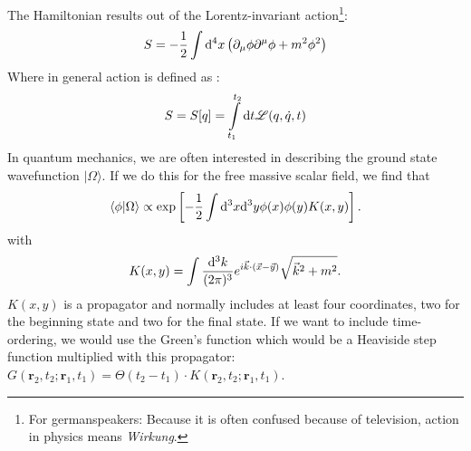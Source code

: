 	The Hamiltonian results out of the Lorentz-invariant action\footnote{For germanspeakers: Because it is often confused because of television, action in physics means \textit{Wirkung}.}:
		\begin{equation}
			S=-\frac{1}{2} \int \mathrm{d}^4 x \left(\partial_\mu \phi \partial^\mu \phi + m^2\phi^2 \right)
		\end{equation}
	Where in general action is defined as \cite{MechanikFliesbach}: 
		\begin{equation} 
			S=S[q]= \int\limits_{t_1}^{t_2} \mathrm{d} t \mathscr{L}(q,\dot q,t)
		\end{equation} 
	In quantum mechanics, we are often interested in describing the ground state wavefunction $|\Omega\rangle$. If we do this for the free massive scalar field, we find that \marginpar{[7]}
		\begin{equation}
			\langle\phi| \Omega\rangle \propto \exp\left[-\frac{1}{2} \int \mathrm{d}^3 x \mathrm{d}^3 y \phi(x)\phi(y) K(x,y)\right].
		\end{equation}
	with
		\begin{equation}
			K(x,y)=\int \frac{\mathrm{d}^3 k}{(2\pi)^3} e^{i\vec{k} \cdot (\vec{x}-\vec{y})} \sqrt{\vec{k}^2+m^2}.
		\end{equation}
	$K(x,y)$ is a propagator and normally includes at least four coordinates, two for the beginning state and two for the final state. If we want to include time-ordering, we would use the Green's function which would be a Heaviside step function multiplied with this propagator: $G(\textbf{r}_2,t_2;\textbf{r}_1,t_1)=\Theta(t_2-t_1)\cdot K(\textbf{r}_2,t_2;\textbf{r}_1,t_1)$.\cite{QEDbuch}\\
	
